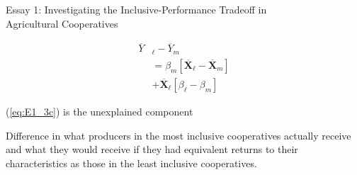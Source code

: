 \documentclass[aspectratio=169]{beamer}
\newenvironment{wideitemize}{\itemize\addtolength{\itemsep}{10pt}}{\enditemize}
\begin{document}
\begin{frame}{Essay 1: Investigating the Inclusive-Performance Tradeoff in \\ \hspace{1.7cm} Agricultural Cooperatives}
        \addtocounter{equation}{-1}
        \begin{subequations}
            \begin{align}
                \overline{Y}&_{\ell} - \overline{Y}_{m} \label{eq:E1_3a} \\
                &= \beta_{m}[\overline{\mathbf{X}}_{\ell} - \overline{\mathbf{X}}_{m}] \label{eq:E1_3b} \\
                &+ \overline{\mathbf{X}}_{\ell}[\beta_{\ell} - \beta_{m}] \label{eq:E1_3c}
            \end{align}
        \end{subequations}  
    \begin{wideitemize}
        \item (\ref{eq:E1_3c}) is the unexplained component \vspace{.25cm}
             \begin{wideitemize}
                \item Difference in what producers in the most inclusive cooperatives actually receive and what they would receive if they had equivalent returns to their characteristics as those in the least inclusive cooperatives.
            \end{wideitemize}
    \end{wideitemize}    
\end{frame}
\end{document}
